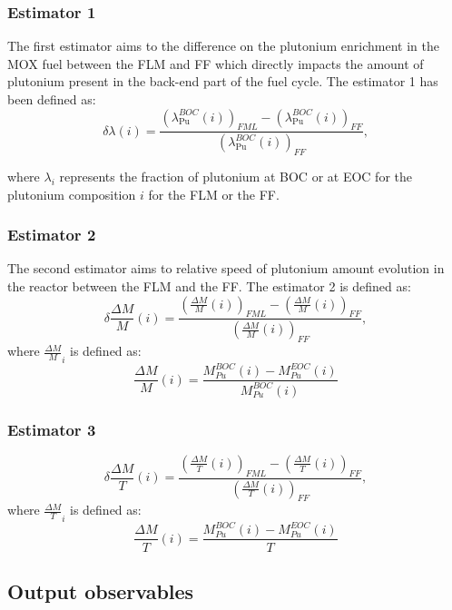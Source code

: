 \subsubsection{Estimator 1}
The first estimator aims to the difference on the plutonium enrichment in the MOX
fuel between the \gls{FLM} and \gls{FF} which directly impacts the amount of
plutonium present in the back-end part of the fuel cycle. The estimator 1 has
been defined as:
\begin{equation}
    \delta{\lambda}(i) =
        \frac{\left(\lambda_{\mathrm{Pu}}^{BOC}(i)\right)_{FML}
              - \left(\lambda_{\mathrm{Pu}}^{BOC}(i)\right)_{FF}}
              {\left(\lambda_{\mathrm{Pu}}^{BOC}(i)\right)_{FF}},
\end{equation}

where $\lambda_i$ represents the fraction of plutonium at \gls{BOC} or at
\gls{EOC} for the plutonium composition $i$ for the \gls{FLM} or the \gls{FF}.

\subsubsection{Estimator 2}
The second estimator aims to relative speed of plutonium amount evolution in the
reactor between the \gls{FLM} and the \gls{FF}. The estimator 2 is defined as:
\begin{equation}
    \delta{\frac{\Delta M}{M}}(i) =
        \frac{\left(\frac{\Delta M}{M}(i)\right)_{FML}
              - \left(\frac{\Delta M}{M}(i)\right)_{FF}}
             {\left(\frac{\Delta M}{M}(i)\right)_{FF}},
\end{equation}
where $\frac{\Delta M}{M}_{i}$ is defined as:
\begin{equation}
    \frac{\Delta M}{M}(i) = \frac{M_{Pu}^{BOC}(i) -
    M_{Pu}^{EOC}(i)}{M_{Pu}^{BOC}(i)}
\end{equation}


\subsubsection{Estimator 3}


\begin{equation}
    \delta{\frac{\Delta M}{T}}(i) =
        \frac{\left(\frac{\Delta M}{T}(i)\right)_{FML}
              - \left(\frac{\Delta M}{T}(i)\right)_{FF}}
             {\left(\frac{\Delta M}{T}(i)\right)_{FF}},
\end{equation}
where $\frac{\Delta M}{T}_{i}$ is defined as:
\begin{equation}
    \frac{\Delta M}{T}(i) = \frac{M_{Pu}^{BOC}(i) -
    M_{Pu}^{EOC}(i)}{T}
\end{equation}

\subsection{Output observables}


